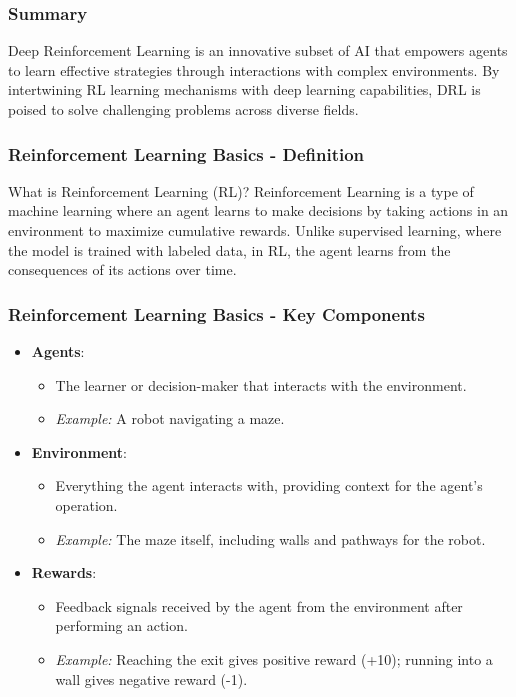 \documentclass[aspectratio=169]{beamer}
\begin{document}
\begin{frame}[fragile]
    \frametitle{Summary}
    Deep Reinforcement Learning is an innovative subset of AI that empowers agents to learn effective strategies through interactions with complex environments. By intertwining RL learning mechanisms with deep learning capabilities, DRL is poised to solve challenging problems across diverse fields.
\end{frame}

\begin{frame}[fragile]
    \frametitle{Reinforcement Learning Basics - Definition}
    \begin{block}{What is Reinforcement Learning (RL)?}
        Reinforcement Learning is a type of machine learning where an agent learns to make decisions by taking actions in an environment to maximize cumulative rewards. 
        Unlike supervised learning, where the model is trained with labeled data, in RL, the agent learns from the consequences of its actions over time.
    \end{block}
\end{frame}

\begin{frame}[fragile]
    \frametitle{Reinforcement Learning Basics - Key Components}
    \begin{itemize}
        \item \textbf{Agents}:
        \begin{itemize}
            \item The learner or decision-maker that interacts with the environment.
            \item \textit{Example:} A robot navigating a maze.
        \end{itemize}
        
        \item \textbf{Environment}:
        \begin{itemize}
            \item Everything the agent interacts with, providing context for the agent's operation.
            \item \textit{Example:} The maze itself, including walls and pathways for the robot.
        \end{itemize}
        
        \item \textbf{Rewards}:
        \begin{itemize}
            \item Feedback signals received by the agent from the environment after performing an action. 
            \item \textit{Example:} Reaching the exit gives positive reward (+10); running into a wall gives negative reward (-1).
        \end{itemize}
    \end{itemize}
\end{frame}
\end{document}
